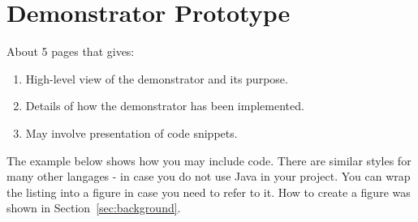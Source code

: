 \section{Demonstrator Prototype}
\label{sec:prototype}

About 5 pages that gives:

\begin{enumerate}
  
\item High-level view of the demonstrator and its purpose.

\item Details of how the demonstrator has been implemented.

\item May involve presentation of code snippets.

\end{enumerate}

The example below shows how you may include code. There are similar
styles for many other langages - in case you do not use Java in your
project. You can wrap the listing into a figure in case you need to
refer to it. How to create a figure was shown in Section~\ref{sec:background}.
  


